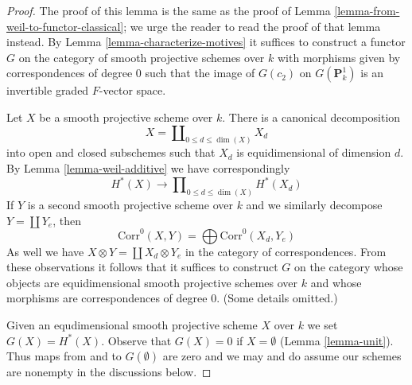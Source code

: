 \begin{proof}
The proof of this lemma is the same as the proof of
Lemma \ref{lemma-from-weil-to-functor-classical};
we urge the reader to read the proof of that lemma instead.
By Lemma \ref{lemma-characterize-motives} it suffices to construct a functor
$G$ on the category of smooth projective schemes over $k$
with morphisms given by correspondences of degree $0$ such that
the image of $G(c_2)$ on $G(\mathbf{P}^1_k)$ is an invertible graded
$F$-vector space.

\medskip\noindent
Let $X$ be a smooth projective scheme over $k$. There is a canonical
decomposition
$$
X = \coprod\nolimits_{0 \leq d \le \dim(X)} X_d
$$
into open and closed subschemes such that $X_d$ is equidimensional
of dimension $d$. By Lemma \ref{lemma-weil-additive} we have correspondingly
$$
H^*(X) \longrightarrow \prod\nolimits_{0 \leq d \le \dim(X)} H^*(X_d)
$$
If $Y$ is a second smooth projective scheme over $k$
and we similarly decompose $Y = \coprod Y_e$, then
$$
\text{Corr}^0(X, Y) = \bigoplus \text{Corr}^0(X_d, Y_e)
$$
As well we have $X \otimes Y = \coprod X_d \otimes Y_e$ in the
category of correspondences. From these observations it follows
that it suffices to construct $G$ on the category whose objects
are equidimensional smooth projective schemes over $k$
and whose morphisms are correspondences of degree $0$. (Some details
omitted.)

\medskip\noindent
Given an equdimensional smooth projective scheme
$X$ over $k$ we set $G(X) = H^*(X)$. Observe that $G(X) = 0$
if $X = \emptyset$ (Lemma \ref{lemma-unit}). Thus maps
from and to $G(\emptyset)$ are zero and we may and do
assume our schemes are nonempty in the discussions below.


\end{proof}
